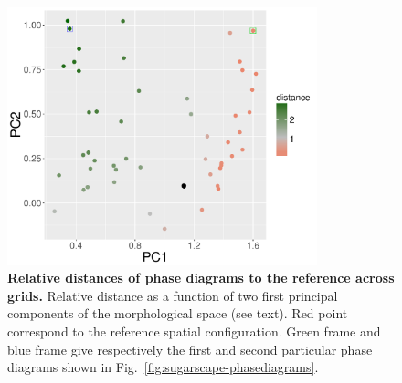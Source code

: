 \documentclass[Royal,sageh,times]{sagej}
\begin{document}
\begin{figure}
\centering
\includegraphics[width=0.8\textwidth]{figures/relativedistance_morphspace}
\caption{\textbf{Relative distances of phase diagrams to the reference across grids.} Relative distance as a function of two first principal components of the morphological space (see text). Red point correspond to the reference spatial configuration. Green frame and blue frame give respectively the first and second particular phase diagrams shown in Fig.~\ref{fig:sugarscape-phasediagrams}.}
\label{fig:sugarscape-distance-pca}
\end{figure}


\end{document}
